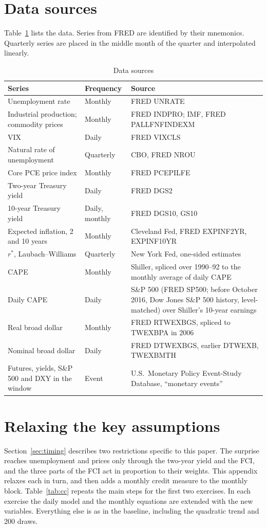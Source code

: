 \documentclass[11pt]{article}
\newcommand{\rs}{r^{*}}
\begin{document}
\section{Data sources}\label{app:data}
Table~\ref{tab:data} lists the data. Series from FRED are identified by their mnemonics. Quarterly series are placed in the middle month of the quarter and interpolated linearly.

\begin{table}[H]\centering\small
\caption{Data sources}\label{tab:data}
\begin{tabular}{p{}p{}p{}}\toprule
Series & Frequency & Source \\\midrule
Unemployment rate & Monthly & FRED UNRATE \\
Industrial production; commodity prices & Monthly & FRED INDPRO; IMF, FRED PALLFNFINDEXM \\
VIX & Daily & FRED VIXCLS \\
Natural rate of unemployment & Quarterly & CBO, FRED NROU \\
Core PCE price index & Monthly & FRED PCEPILFE \\
Two-year Treasury yield & Daily & FRED DGS2 \\
10-year Treasury yield & Daily, monthly & FRED DGS10, GS10 \\
Expected inflation, 2 and 10 years & Monthly & Cleveland Fed, FRED EXPINF2YR, EXPINF10YR \\
$\rs$, Laubach--Williams & Quarterly & New York Fed, one-sided estimates \\
CAPE & Monthly & Shiller, spliced over 1990--92 to the monthly average of daily CAPE \\
Daily CAPE & Daily & S\&P 500 (FRED SP500; before October 2016, Dow Jones S\&P 500 history, level-matched) over Shiller's 10-year earnings \\
Real broad dollar & Monthly & FRED RTWEXBGS, spliced to TWEXBPA in 2006 \\
Nominal broad dollar & Daily & FRED DTWEXBGS, earlier DTWEXB, TWEXBMTH \\
Futures, yields, S\&P 500 and DXY in the window & Event & U.S.\ Monetary Policy Event-Study Database, ``monetary events'' \citep{acosta2025} \\\bottomrule
\end{tabular}
\end{table}

\section{Relaxing the key assumptions}\label{app:assump}
Section~\ref{sec:timing} describes two restrictions specific to this paper. The surprise reaches unemployment and prices only through the two-year yield and the FCI, and the three parts of the FCI act in proportion to their weights. This appendix relaxes each in turn, and then adds a monthly credit measure to the monthly block. Table~\ref{tab:cc} repeats the main steps for the first two exercises. In each exercise the daily model and the monthly equations are extended with the new variables. Everything else is as in the baseline, including the quadratic trend and 200 draws.
\end{document}
